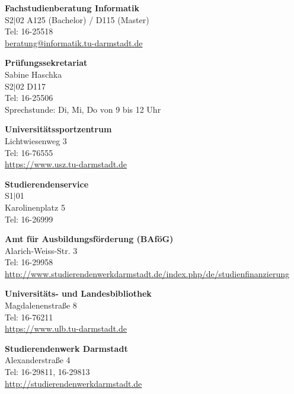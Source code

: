 \begin{multicols}{2}
    \vspace{3mm}
    \textbf{Fachstudienberatung Informatik}\\
    S2$|$02 A125 (Bachelor) / D115 (Master)\\
    Tel: 16-25518 \\
    \href{mailto:beratung@informatik.tu-darmstadt.de}{beratung@informatik.tu-darmstadt.de}

    \vspace{3mm}
    \textbf{Prüfungssekretariat}\\
    Sabine Haschka\\
    S2$|$02 D117\\
    Tel: 16-25506\\
    Sprechstunde: Di, Mi, Do von 9 bis 12 Uhr

    \vspace{3mm}
    \textbf{Universitätssportzentrum}\\
    Lichtwiesenweg 3\\
    Tel: 16-76555\\
    \url{https://www.usz.tu-darmstadt.de}

    \vspace{3mm}
    \textbf{Studierendenservice}\\
    S1$|$01\\
    Karolinenplatz 5\\
    Tel: 16-26999

    \vspace{3mm}
    \textbf{Amt für Ausbildungsförderung (BAföG)}\\
    Alarich-Weiss-Str. 3 \\
    Tel: 16-29958\\
    \url{http://www.studierendenwerkdarmstadt.de/index.php/de/studienfinanzierung}

    \vspace{3mm}
    \textbf{Universitäts- und Landesbibliothek}\\
    Magdalenenstraße 8\\
    Tel: 16-76211\\
    \url{https://www.ulb.tu-darmstadt.de}

    \vspace{3mm}
    \textbf{Studierendenwerk Darmstadt}\\
    Alexanderstraße 4 \\
    Tel: 16-29811, 16-29813\\
    \url{http://studierendenwerkdarmstadt.de}


\end{multicols}

\newpage
